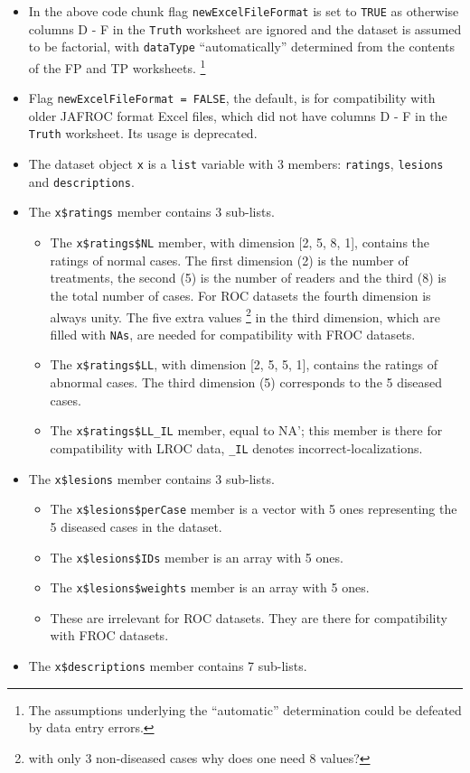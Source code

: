 \documentclass[
]{book}
\providecommand{\tightlist}{%
  \setlength{\itemsep}{0pt}\setlength{\parskip}{0pt}}
\begin{document}
\begin{itemize}
\tightlist
\item
  In the above code chunk flag \texttt{newExcelFileFormat} is set to \texttt{TRUE} as otherwise columns D - F in the \texttt{Truth} worksheet are ignored and the dataset is assumed to be factorial, with \texttt{dataType} ``automatically'' determined from the contents of the FP and TP worksheets. \footnote{The assumptions underlying the ``automatic'' determination could be defeated by data entry errors.}
\item
  Flag \texttt{newExcelFileFormat\ =\ FALSE}, the default, is for compatibility with older JAFROC format Excel files, which did not have columns D - F in the \texttt{Truth} worksheet. Its usage is deprecated.
\item
  The dataset object \texttt{x} is a \texttt{list} variable with 3 members: \texttt{ratings}, \texttt{lesions} and \texttt{descriptions}.
\item
  The \texttt{x\$ratings} member contains 3 sub-lists.

  \begin{itemize}
  \tightlist
  \item
    The \texttt{x\$ratings\$NL} member, with dimension {[}2, 5, 8, 1{]}, contains the ratings of normal cases. The first dimension (2) is the number of treatments, the second (5) is the number of readers and the third (8) is the total number of cases. For ROC datasets the fourth dimension is always unity. The five extra values \footnote{with only 3 non-diseased cases why does one need 8 values?} in the third dimension, which are filled with \texttt{NAs}, are needed for compatibility with FROC datasets.
  \item
    The \texttt{x\$ratings\$LL}, with dimension {[}2, 5, 5, 1{]}, contains the ratings of abnormal cases. The third dimension (5) corresponds to the 5 diseased cases.
  \item
    The \texttt{x\$ratings\$LL\_IL} member, equal to NA'; this member is there for compatibility with LROC data, \texttt{\_IL} denotes incorrect-localizations.
  \end{itemize}
\item
  The \texttt{x\$lesions} member contains 3 sub-lists.

  \begin{itemize}
  \tightlist
  \item
    The \texttt{x\$lesions\$perCase} member is a vector with 5 ones representing the 5 diseased cases in the dataset.
  \item
    The \texttt{x\$lesions\$IDs} member is an array with 5 ones.
  \item
    The \texttt{x\$lesions\$weights} member is an array with 5 ones.
  \item
    These are irrelevant for ROC datasets. They are there for compatibility with FROC datasets.
  \end{itemize}
\item
  The \texttt{x\$descriptions} member contains 7 sub-lists.


\end{itemize}
\end{document}
